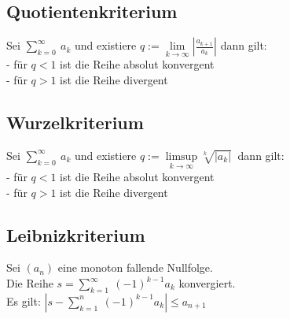 \documentclass[german]{latex4ei/latex4ei_sheet}
\begin{document}
\begin{sectionbox}
	\subsection{Quotientenkriterium}
	Sei $\sum \limits_{k=0}^{\infty}\ a_k$ und existiere
	$q := \lim\limits_{k \to \infty} |\frac{a_{k+1}}{a_k}| $ dann gilt: \\
	- für $q<1$ ist die Reihe absolut konvergent\\
	- für $q>1$ ist die Reihe divergent

\end{sectionbox}

\begin{sectionbox}
	\subsection{Wurzelkriterium}

		Sei $\sum \limits_{k=0}^{\infty}\ a_k$ und existiere
	$q := \limsup \limits_{k \to \infty} \sqrt[k]{|a_k|}\ $ dann gilt: \\
	- für $q<1$ ist die Reihe absolut konvergent\\
	- für $q>1$ ist die Reihe divergent

\end{sectionbox}

\begin{sectionbox}
	\subsection{Leibnizkriterium}
	Sei $(a_n)$ eine monoton fallende Nullfolge.\\Die  Reihe $s = \sum \limits_{k=1}^{\infty}\ (-1)^{k-1} a_k$ konvergiert.\\
	Es gilt: $|s - \sum \limits_{k=1}^{n}\ (-1)^{k-1} a_k| \le a_{n+1}$




\end{sectionbox}
\end{document}
